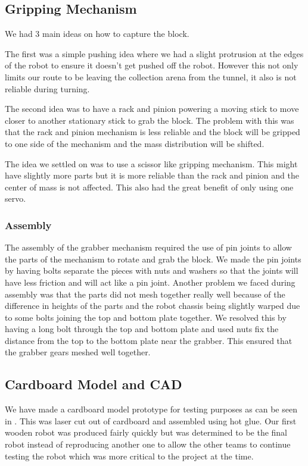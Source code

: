 \documentclass{article}
\begin{document}
\subsection{Gripping Mechanism}
\quad We had 3 main ideas on how to capture the block. 

\quad The first was a simple pushing idea where we had a slight protrusion at the edges of the robot to ensure it doesn't get pushed off the robot. However this not only limits our route to be leaving the collection arena from the tunnel, it also is not reliable during turning.

\quad The second idea was to have a rack and pinion powering a moving stick to move closer to another stationary stick to grab the block. The problem with this was that the rack and pinion mechanism is less reliable and the block will be gripped to one side of the mechanism and the mass distribution will be shifted.

\quad The idea we settled on was to use a scissor like gripping mechanism. This might have slightly more parts but it is more reliable than the rack and pinion and the center of mass is not affected. This also had the great benefit of only using one servo.

\subsubsection{Assembly}

\quad The assembly of the grabber mechanism required the use of pin joints to allow the parts of the mechanism to rotate and grab the block. We made the pin joints by having bolts separate the pieces with nuts and washers so that the joints will have less friction and will act like a pin joint. Another problem we faced during assembly was that the parts did not mesh together really well because of the difference in heights of the parts and the robot chassis being slightly warped due to some bolts joining the top and bottom plate together. We resolved this by having a long bolt through the top and bottom plate and used nuts fix the distance from the top to the bottom plate near the grabber. This ensured that the grabber gears meshed well together.

\subsection{Cardboard Model and CAD}
\quad We have made a cardboard model prototype for testing purposes as can be seen in . This was laser cut out of cardboard and assembled using hot glue. Our first wooden robot was produced fairly quickly but was determined to be the final robot instead of reproducing another one to allow the other teams to continue testing the robot which was more critical to the project at the time.
\end{document}
